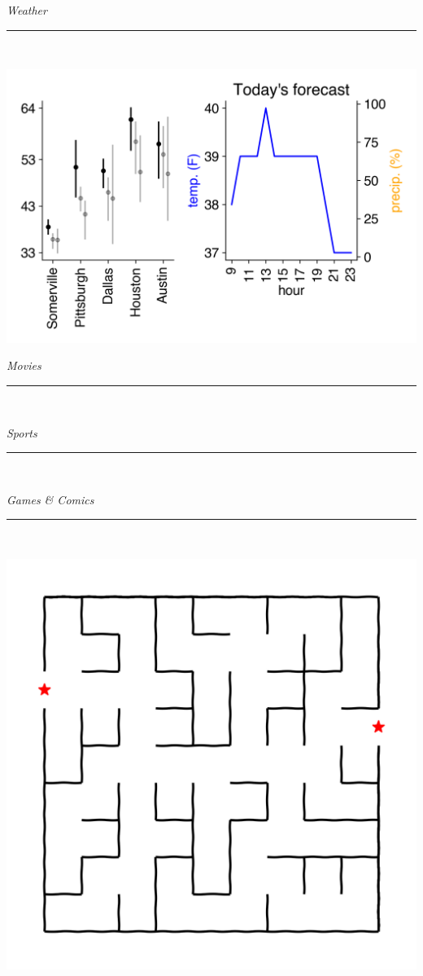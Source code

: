\documentclass[landscape]{article}
\date{\today}
\renewcommand\headline[1]{\begin{center} {\huge \textsl{ #1}}\\ %
			\rule[5pt]{0.8\hsize}{0.5pt}\\ \end{center}}
\begin{document}
\maketitle

\begin{multicols}{3}
\headline{Weather}
\vspace{-0.5cm}\includegraphics[width=\linewidth]{images/weather.png}

\headline{Movies}


\headline{Sports}


\begin{center}
	
\end{center}
\begin{center}
	
\end{center}

\headline{Games \& Comics}
\center\includegraphics[width=0.95\linewidth]{images/maze_r.png}


\end{multicols}
\end{document}
